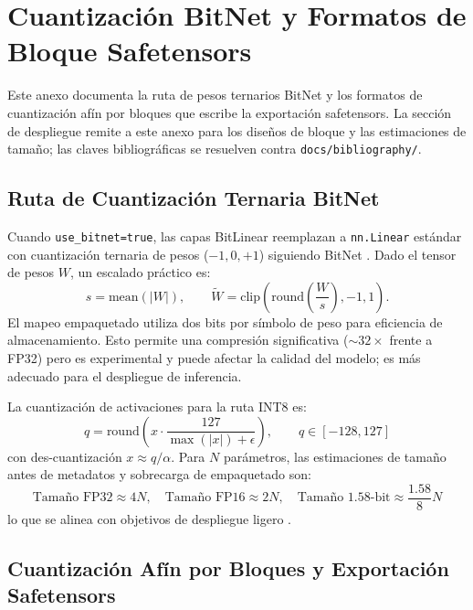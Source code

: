 \section{Cuantización BitNet y Formatos de Bloque Safetensors}
\label{sec:annex-bitnet}

Este anexo documenta la ruta de pesos ternarios BitNet y los formatos de cuantización afín por bloques que escribe la exportación safetensors. La sección de despliegue remite a este anexo para los diseños de bloque y las estimaciones de tamaño; las claves bibliográficas se resuelven contra \texttt{docs/bibliography/}.

\subsection{Ruta de Cuantización Ternaria BitNet}

Cuando \texttt{use\_bitnet=true}, las capas BitLinear reemplazan a \texttt{nn.Linear} estándar con cuantización ternaria de pesos ($-1, 0, +1$) siguiendo BitNet \citep{wang_bitnet_2023}. Dado el tensor de pesos $W$, un escalado práctico es:
\[
s=\text{mean}(|W|),\qquad
\tilde{W}=\text{clip}\left(\text{round}\left(\frac{W}{s}\right),-1,1\right).
\]
El mapeo empaquetado utiliza dos bits por símbolo de peso para eficiencia de almacenamiento. Esto permite una compresión significativa ($\sim 32\times$ frente a FP32) pero es experimental y puede afectar la calidad del modelo; es más adecuado para el despliegue de inferencia.

La cuantización de activaciones para la ruta INT8 es:
\[
q=\text{round}\left(x\cdot\frac{127}{\max(|x|)+\epsilon}\right),\qquad q\in[-128,127]
\]
con des-cuantización $x\approx q/\alpha$. Para $N$ parámetros, las estimaciones de tamaño antes de metadatos y sobrecarga de empaquetado son:
\[
\text{Tamaño FP32}\approx 4N,\quad \text{Tamaño FP16}\approx 2N,\quad \text{Tamaño 1.58-bit}\approx \frac{1.58}{8}N
\]
lo que se alinea con objetivos de despliegue ligero \citep{samson_lightweight_2026,bravin_embbert_2026}.

\subsection{Cuantización Afín por Bloques y Exportación Safetensors}
\label{sec:annex-block-affine}

